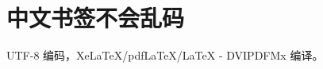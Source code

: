\documentclass[12pt]{article}
\begin{document}
 
    \tableofcontents
    \listoftables
    \listoffigures

    \section{中文书签不会乱码}
    UTF-8 编码，Xe\LaTeX{}/pdf\LaTeX{}/\LaTeX{} - DVIPDFMx 编译。


    
\end{document}
